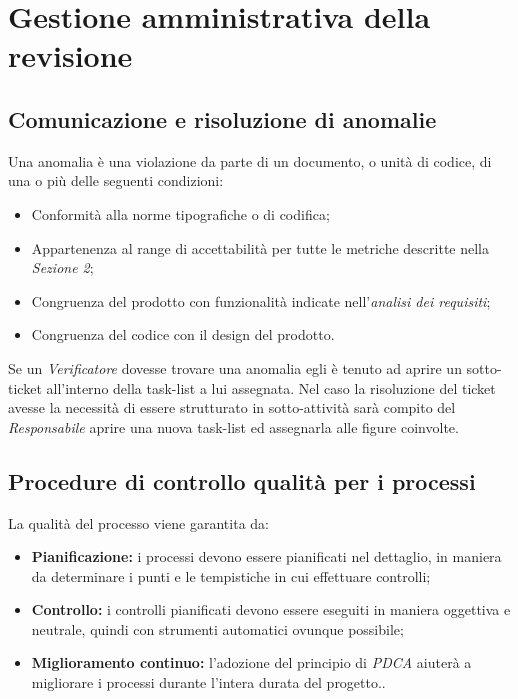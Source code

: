 \documentclass[a4paper]{article}
\begin{document}
										
			
	\section{Gestione amministrativa della revisione}
		\subsection{Comunicazione e risoluzione di anomalie}
			Una anomalia è una violazione da parte di un documento, o unità di codice, di una o più delle seguenti condizioni:
			\begin{itemize}
				\item Conformità alla norme tipografiche o di codifica;
				\item Appartenenza al range di accettabilità per tutte le metriche descritte nella \emph{Sezione 2};
				\item Congruenza del prodotto con funzionalità indicate nell'\emph{analisi dei requisiti};
				\item Congruenza del codice con il design del prodotto.
			\end{itemize}
			Se un \emph{Verificatore} dovesse trovare una anomalia egli è tenuto ad aprire un sotto-ticket all'interno 
			della task-list a lui assegnata. Nel caso la risoluzione del ticket avesse la necessità di essere strutturato 
			in sotto-attività sarà compito del \emph{Responsabile} aprire una nuova task-list ed assegnarla alle figure coinvolte.

		\subsection{Procedure di controllo qualità per i processi}
			La qualità del processo viene garantita da:
			\begin{itemize}
				\item \textbf{Pianificazione:} i processi devono essere pianificati nel dettaglio, in maniera da determinare 
				i punti e le tempistiche in cui effettuare controlli;
				\item \textbf{Controllo:} i controlli pianificati devono essere eseguiti in maniera oggettiva e neutrale, 
				quindi con strumenti automatici ovunque possibile;
				\item \textbf{Miglioramento continuo:} l'adozione del principio di \emph{PDCA} aiuterà a migliorare i processi durante l'intera durata del progetto..
			\end{itemize}
\end{document}

